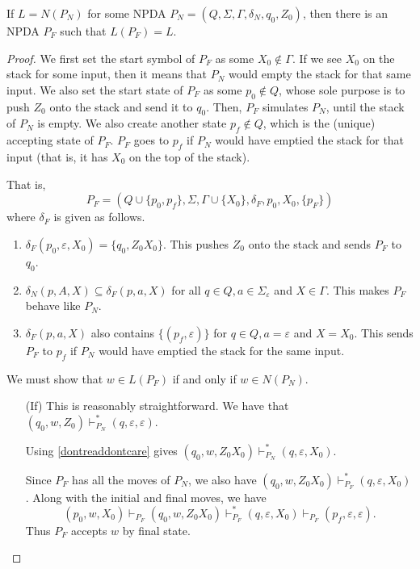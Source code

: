 \begin{lemma}
\label{finalifemptystk}
    If $L=N(P_N)$ for some NPDA $P_N=(Q,\Sigma,\Gamma,\delta_N,q_0,Z_0)$, then there is an NPDA $P_F$ such that $L(P_F)=L$.
\end{lemma}
\begin{proof}
We first set the start symbol of $P_F$ as some $X_0\not\in\Gamma$. If we see $X_0$ on the stack for some input, then it means that $P_N$ would empty the stack for that same input. We also set the start state of $P_F$ as some $p_0\not\in Q$, whose sole purpose is to push $Z_0$ onto the stack and send it to $q_0$. Then, $P_F$ simulates $P_N$, until the stack of $P_N$ is empty. We also create another state $p_f\not\in Q$, which is the (unique) accepting state of $P_F$. $P_F$ goes to $p_f$ if $P_N$ would have emptied the stack for that input (that is, it has $X_0$ on the top of the stack).

That is, $$P_F=(Q\cup\{p_0,p_f\}, \Sigma, \Gamma\cup\{X_0\}, \delta_F, p_0, X_0, \{p_F\})$$where $\delta_F$ is given as follows.
\begin{enumerate}
    \item $\delta_F(p_0,\varepsilon,X_0)=\{q_0, Z_0X_0\}$. This pushes $Z_0$ onto the stack and sends $P_F$ to $q_0$.
    \item $\delta_N(p,A,X)\subseteq\delta_F(p,a,X)$ for all $q\in Q, a\in\Sigma_\varepsilon$ and $X\in\Gamma$. This makes $P_F$ behave like $P_N$.
    \item $\delta_F(p,a,X)$ also contains $\{(p_f,\varepsilon)\}$ for $q\in Q, a=\varepsilon$ and $X=X_0$. This sends $P_F$ to $p_f$ if $P_N$ would have emptied the stack for the same input.
\end{enumerate}

We must show that $w\in L(P_F)$ if and only if $w\in N(P_N)$.
\begin{itemize}
    \item[(If)] This is reasonably straightforward. We have that $(q_0,w,Z_0)\vdash^*_{P_N}(q,\varepsilon,\varepsilon)$.
    
    Using \ref{dontreaddontcare} gives $(q_0,w,Z_0X_0)\vdash^*_{P_N} (q,\varepsilon,X_0)$.
    
    Since $P_F$ has all the moves of $P_N$, we also have $(q_0,w,Z_0X_0)\vdash^*_{P_F} (q,\varepsilon,X_0)$. Along with the initial and final moves, we have
    $$(p_0,w,X_0)\vdash_{P_F}(q_0,w,Z_0X_0)\vdash^*_{P_F} (q,\varepsilon,X_0)\vdash_{P_F}(p_f,\varepsilon,\varepsilon).$$
    Thus $P_F$ accepts $w$ by final state.
    

\end{itemize}
\end{proof}
